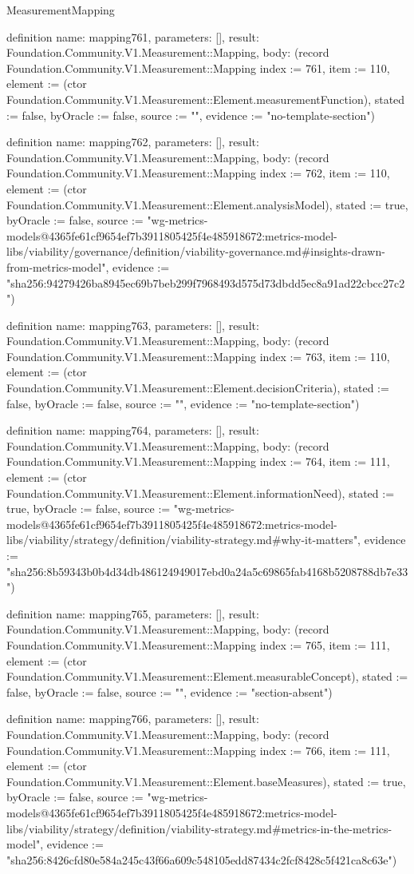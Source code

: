 \begin{lexlean}{MeasurementMapping}
\begin{semanticmodule}
definition{
  name: mapping761,
  parameters: [],
  result: Foundation.Community.V1.Measurement::Mapping,
  body: (record Foundation.Community.V1.Measurement::Mapping {index := 761, item := 110, element := (ctor Foundation.Community.V1.Measurement::Element.measurementFunction), stated := false, byOracle := false, source := "", evidence := "no-template-section"})
}

definition{
  name: mapping762,
  parameters: [],
  result: Foundation.Community.V1.Measurement::Mapping,
  body: (record Foundation.Community.V1.Measurement::Mapping {index := 762, item := 110, element := (ctor Foundation.Community.V1.Measurement::Element.analysisModel), stated := true, byOracle := false, source := "wg-metrics-models@4365fe61cf9654ef7b3911805425f4e485918672:metrics-model-libs/viability/governance/definition/viability-governance.md#insights-drawn-from-metrics-model", evidence := "sha256:94279426ba8945ec69b7beb299f7968493d575d73dbdd5ec8a91ad22cbcc27c2"})
}

definition{
  name: mapping763,
  parameters: [],
  result: Foundation.Community.V1.Measurement::Mapping,
  body: (record Foundation.Community.V1.Measurement::Mapping {index := 763, item := 110, element := (ctor Foundation.Community.V1.Measurement::Element.decisionCriteria), stated := false, byOracle := false, source := "", evidence := "no-template-section"})
}

definition{
  name: mapping764,
  parameters: [],
  result: Foundation.Community.V1.Measurement::Mapping,
  body: (record Foundation.Community.V1.Measurement::Mapping {index := 764, item := 111, element := (ctor Foundation.Community.V1.Measurement::Element.informationNeed), stated := true, byOracle := false, source := "wg-metrics-models@4365fe61cf9654ef7b3911805425f4e485918672:metrics-model-libs/viability/strategy/definition/viability-strategy.md#why-it-matters", evidence := "sha256:8b59343b0b4d34db486124949017ebd0a24a5c69865fab4168b5208788db7e33"})
}

definition{
  name: mapping765,
  parameters: [],
  result: Foundation.Community.V1.Measurement::Mapping,
  body: (record Foundation.Community.V1.Measurement::Mapping {index := 765, item := 111, element := (ctor Foundation.Community.V1.Measurement::Element.measurableConcept), stated := false, byOracle := false, source := "", evidence := "section-absent"})
}

definition{
  name: mapping766,
  parameters: [],
  result: Foundation.Community.V1.Measurement::Mapping,
  body: (record Foundation.Community.V1.Measurement::Mapping {index := 766, item := 111, element := (ctor Foundation.Community.V1.Measurement::Element.baseMeasures), stated := true, byOracle := false, source := "wg-metrics-models@4365fe61cf9654ef7b3911805425f4e485918672:metrics-model-libs/viability/strategy/definition/viability-strategy.md#metrics-in-the-metrics-model", evidence := "sha256:8426cfd80e584a245c43f66a609c548105edd87434c2fcf8428c5f421ca8c63e"})
}


\end{semanticmodule}
\end{lexlean}
